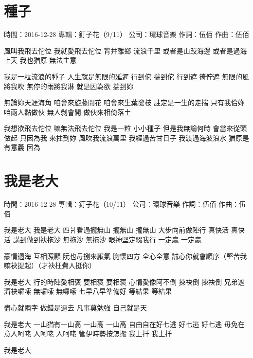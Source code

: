 \documentclass[UTF8,a4paper,oneside,twocolumn,12pt]{ctexbook}
\newcommand{\infopair}[2]{\textbullet #1：#2}
\newcommand{\zc}[1][伍佰]{\infopair{作詞}{#1}}
\newcommand{\zq}[1][伍佰]{\infopair{作曲}{#1}}
\newcommand{\zj}[1]{\infopair{專輯}{#1}}
\newcommand{\sj}[1]{\infopair{時間}{#1}}
\newcommand{\gs}[1]{\infopair{公司}{#1}}
\newenvironment{info}{\begin{flushleft}\kaishu
	}
	{\end{flushleft}\normalsize\yahei\par}
\newenvironment{lyric}{
	}
{}
\begin{document}
\section{種子}
\begin{info}
	\sj{2016-12-28}
	\zj{釘子花（9/11）}
	\gs{環球音樂}
	\zc
	\zq
\end{info}
\begin{lyric}
	風叫我飛去佗位 我就愛飛去佗位
	背井離鄉 流浪千里
	或者是山跤海邊 或者是過海上天
	我也猶原 無法主意

	我是一粒流浪的種子 人生就是無限的延遲
	行到佗 揣到佗 行到遮 徛佇遮
	無限的風將我吹 無停的雨將我淋
	就是因為欲 揣到妳

	無論妳天涯海角
	咱會來旋藤開花 咱會來生葉發枝
	註定是一生的走揣
	只有我佮妳 咱兩人黏做伙 無人剝會開
	做伙來相倚落土

	我想欲飛去佗位 嘛無法飛去佗位
	我是一粒 小小種子
	但是我無論何時 會當來從頭做起
	只因為我 來拄到妳
	風吹我流浪萬里
	我經過苦甘日子 我渡過海波浪水
	猶原是有意義 因為
\end{lyric}

\section{我是老大}
\begin{info}
	\sj{2016-12-28}
	\zj{釘子花（10/11）}
	\gs{環球音樂}
	\zc
	\zq
\end{info}
\begin{lyric}
	我是老大 我是老大
	四爿看過攏無山 攏無山 攏無山
	大步向前做陣行 真快活 真快活
	講到做到袂拖沙 無拖沙 無拖沙
	眼神堅定綴我行 一定贏 一定贏

	豪情迵海 互相照顧
	阮也毋捌來厭氣
	胸懷四方 全心全意
	誠心你就會順序（堅苦我嘛袂提起）（才袂枉費人挺你）

	我是老大
	行的時陣愛相褒 要相褒 要相褒
	心情愛像阿不倒 捒袂倒 捒袂倒
	兄弟遮濟袂囉嗦 無囉嗦 無囉嗦
	七早八早準備好 等結果 等結果

	盡心就兩字 做錯是過去
	凡事莫勉強 自己就是天

	我是老大
	一山猶有一山高 一山高 一山高
	自由自在好七逃 好七逃 好七逃
	毋免在意人呵咾 人呵咾 人呵咾
	管伊時勢按怎搬 我上扦 我上扦

	我是老大
\end{lyric}
\end{document}
